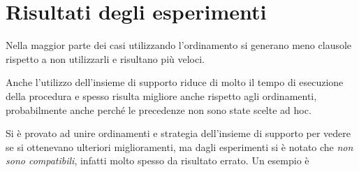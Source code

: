 \documentclass[a4paper,11pt]{article} %
\newcommand{\file}{\texttt}
\newcommand{\campo}{\texttt}
\begin{document}
\section{Risultati degli esperimenti}\label{sec: esperimenti}
Nella maggior parte dei casi utilizzando l'ordinamento si generano meno clausole
rispetto a non utilizzarli e risultano più veloci. %

Anche l'utilizzo dell'insieme di supporto riduce di molto il tempo di esecuzione
della procedura%
 e spesso risulta migliore anche rispetto agli ordinamenti,
probabilmente anche perché le precedenze non sono state scelte ad hoc.

Si è provato ad unire ordinamenti e strategia dell'insieme di supporto per vedere
se si ottenevano ulteriori miglioramenti, ma dagli esperimenti si è notato che 
\emph{non sono compatibili}, infatti molto spesso da risultato errato.  
Un esempio è %
\end{document}
